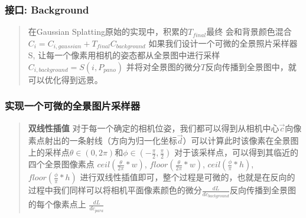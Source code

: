 \begin{frame}
    \frametitle{接口: Background}
    \begin{quote}
        在Gaussian Splatting原始的实现中，积累的$T_{final}$最终
        会和背景颜色混合 $C_i=C_{i,gaussian} + T_{final}C_{background}$
        如果我们设计一个可微的全景照片采样器S,
        让每一个像素用相机的姿态都从全景图中进行采样$C_{i,background}=S(i,P_{pano})$
        并将对全景图的微分$T$反向传播到全景图中，就可以优化得到远景。
    \end{quote}
\end{frame}

\begin{frame}
    \frametitle{实现一个可微的全景图片采样器}
    \begin{quote}
        \textbf{双线性插值}
        对于每一个确定的相机位姿，我们都可以得到从相机中心$\vec{c}$向像素点射出的一条射线（方向为归一化坐标$\vec{d}$）可以计算此时该像素在全景图上的采样点$\theta \in (0,2\pi)$和$\phi\in(-\frac{\pi}{2},\frac{\pi}{2})$
        对于该采样点，可以得到其临近的四个全景图像素点 $ceil(\frac{\theta}{2\pi} * w)$, $floor(\frac{\theta}{2\pi} * w)$, $ceil(\frac{\phi}{\pi} * h)$, $floor(\frac{\phi}{\pi} * h)$
        进行双线性插值即可，整个过程是可微的，也就是在反向的过程中我们同样可以将相机平面像素颜色的微分$\frac{dL}{dc_{background}}$反向传播到全景图的每个像素点上 $\frac{dL}{dc_{para}}$
    \end{quote}
\end{frame}

